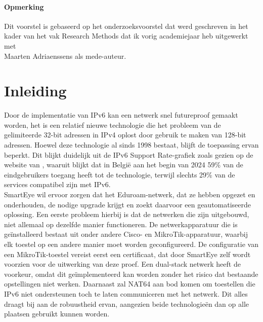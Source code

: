 

\paragraph{Opmerking}

Dit voorstel is gebaseerd op het onderzoeksvoorstel dat werd geschreven in het
kader van het vak Research Methods dat ik vorig academiejaar heb
uitgewerkt met \\ Maarten Adriaenssens als mede-auteur.


\section{Inleiding}%
\label{sec:inleiding}

Door de implementatie van IPv6 kan een netwerk snel futureproof gemaakt worden, het is een relatief nieuwe technologie die het probleem van de gelimiteerde 32-bit adressen in IPv4 oplost
door gebruik te maken van 128-bit adressen. Hoewel deze technologie al sinds 1998 bestaat, blijft de toepassing ervan beperkt. 
Dit blijkt duidelijk uit de IPv6 Support Rate-grafiek zoals gezien op de website van \textcite{EuropeanCommission}, 
waaruit blijkt dat in België aan het begin van 2024 59\% van de eindgebruikers toegang heeft tot de technologie, 
terwijl slechts 29\% van de services compatibel zijn met IPv6.\\

SmartEye wil ervoor zorgen dat het Eduroam-netwerk, dat ze hebben opgezet en onderhouden, de nodige upgrade krijgt en zoekt daarvoor een geautomatiseerde oplossing. 
Een eerste probleem hierbij is dat de netwerken die zijn uitgebouwd, 
niet allemaal op dezelfde manier functioneren. De netwerkapparatuur die is geïnstalleerd bestaat uit onder andere Cisco- en MikroTik-apparatuur, 
waarbij elk toestel op een andere manier moet worden geconfigureerd.  
De configuratie van een MikroTik-toestel vereist eerst een certificaat, dat door SmartEye zelf wordt voorzien voor de uitwerking van deze proef. 
Een dual-stack netwerk heeft de voorkeur, omdat dit geïmplementeerd kan worden zonder het risico dat bestaande opstellingen niet werken. 
Daarnaast zal NAT64 aan bod komen om toestellen die IPv6 niet ondersteunen toch te laten communiceren met het netwerk. Dit alles draagt bij aan de robuustheid ervan, 
aangezien beide technologieën dan op alle plaatsen gebruikt kunnen worden. \\

